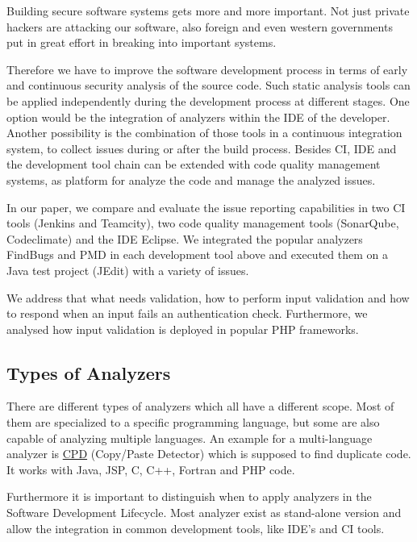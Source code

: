 \documentclass[conference]{IEEEtran}
\begin{document}
Building secure software systems gets more and more important. Not just private hackers are attacking our software, also foreign and even western governments put in great effort in breaking into important systems\cite{NSAHacking}.


Therefore we have to improve the software development process in terms of early and continuous security analysis of the source code.
Such static analysis tools can be applied independently during the development process at different stages.
One option would be the integration of analyzers within the IDE of the developer.
Another possibility is the combination of those tools in a continuous integration system, to collect issues during or after the build process.
Besides CI, IDE and the development tool chain can be extended with code quality management systems, as platform for analyze the code and manage the analyzed issues.


In our paper, we compare and evaluate the issue reporting capabilities in two CI tools (Jenkins and Teamcity), two code quality management tools (SonarQube, Codeclimate) and the IDE Eclipse.
We integrated the popular analyzers FindBugs and PMD in each development tool above and executed them on a Java test project (JEdit) with a variety of issues.


We address that what needs validation, how to perform input validation and how to respond when an input fails an authentication check. Furthermore, we analysed how input validation is deployed in popular PHP frameworks.







\subsection{Types of Analyzers}
There are different types of analyzers which all have a different scope. Most of them are specialized to a specific programming language, but some are also capable of analyzing multiple languages. An example for a multi-language analyzer is \href{http://pmd.sourceforge.net/pmd-4.3.0/cpd.html}{CPD} (Copy/Paste Detector) which is supposed to find duplicate code. It works with Java, JSP, C, C++, Fortran and PHP code.


Furthermore it is important to distinguish when to apply analyzers in the Software Development Lifecycle.
Most analyzer exist as stand-alone version and allow the integration in common development tools, like IDE's and CI tools.
\end{document}

